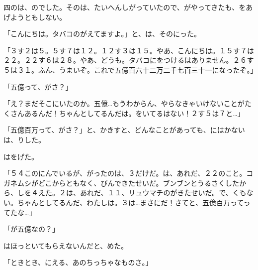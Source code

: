 四のは、のでした。そのは、たいへんしがっていたので、がやってきたも、をあげようともしない。

「こんにちは。タバコのがえてますよ。」と、は、そのにった。

「３す２は５。５す７は１２。１２す３は１５。やあ、こんにちは。１５す７は２２。２２す６は２８。やあ、どうも。タバコにをつけるはありません。２６す５は３１。ふん、うまいぞ。これで五億百六十二万二千七百三十一になったぞ。」

「五億って、がさ？」

「え？まだそこにいたのか。五億…もうわからん、やらなきゃいけないことがたくさんあるんだ！ちゃんとしてるんだは。をいてるはない！２す５は７と…」

「五億百万って、がさ？」と、かきすと、どんなことがあっても、にはかないは、りした。

はをげた。

「５４このにんでいるが、がったのは、３だけだ。は、あれだ、２２のこと。コガネムシがどこからともなく、びんできたせいだ。ブンブンとうるさくしたから、しを４えた。２は、あれだ、１１、リュウマチのがきたせいだ。で、くもない。ちゃんとしてるんだ、わたしは。３は…まさにだ！さてと、五億百万ってってたな…」

「が五億なの？」

はほっといてもらえないんだと、めた。

「ときとき、にえる、あのちっちゃなものさ。」

